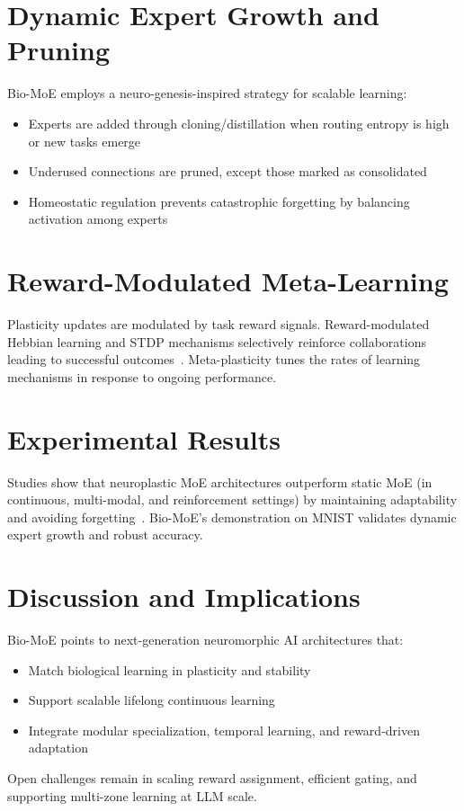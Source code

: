 \documentclass[12pt]{article}
\begin{document}
\section{Dynamic Expert Growth and Pruning}
Bio-MoE employs a neuro-genesis-inspired strategy for scalable learning:
\begin{itemize}
    \item Experts are added through cloning/distillation when routing entropy is high or new tasks emerge
    \item Underused connections are pruned, except those marked as consolidated
    \item Homeostatic regulation prevents catastrophic forgetting by balancing activation among experts
\end{itemize}

\section{Reward-Modulated Meta-Learning}
Plasticity updates are modulated by task reward signals. Reward-modulated Hebbian learning and STDP mechanisms selectively reinforce collaborations leading to successful outcomes~\citep{fremaux2010functional,legenstein2008reward,sorn2015reward}. Meta-plasticity tunes the rates of learning mechanisms in response to ongoing performance.

\section{Experimental Results}
Studies show that neuroplastic MoE architectures outperform static MoE (in continuous, multi-modal, and reinforcement settings) by maintaining adaptability and avoiding forgetting~\citep{willie2024rlj,liu2024neuroplastic,han2023dsd}. Bio-MoE's demonstration on MNIST validates dynamic expert growth and robust accuracy.

\section{Discussion and Implications}
Bio-MoE points to next-generation neuromorphic AI architectures that:
\begin{itemize}
    \item Match biological learning in plasticity and stability
    \item Support scalable lifelong continuous learning
    \item Integrate modular specialization, temporal learning, and reward-driven adaptation
\end{itemize}
Open challenges remain in scaling reward assignment, efficient gating, and supporting multi-zone learning at LLM scale.
\end{document}
